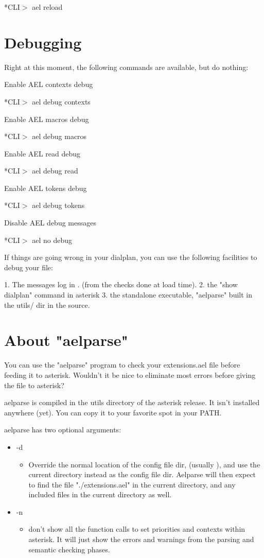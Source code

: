     *CLI$>$ ael reload

\section{Debugging}

Right at this moment, the following commands are available, but do
nothing:

Enable AEL contexts debug

   *CLI$>$ ael debug contexts

Enable AEL macros debug

   *CLI$>$ ael debug macros

Enable AEL read debug

   *CLI$>$ ael debug read

Enable AEL tokens debug

   *CLI$>$ ael debug tokens

Disable AEL debug messages

   *CLI$>$ ael no debug

If things are going wrong in your dialplan, you can use the following
facilities to debug your file:

1. The messages log in . (from the checks done at load time).
2. the "show dialplan" command in asterisk
3. the standalone executable, "aelparse" built in the utils/ dir in the source.


\section{About "aelparse"}

You can use the "aelparse" program to check your extensions.ael
file before feeding it to asterisk. Wouldn't it be nice to eliminate
most errors before giving the file to asterisk?

aelparse is compiled in the utils directory of the asterisk release.
It isn't installed anywhere (yet). You can copy it to your favorite
spot in your PATH.

aelparse has two optional arguments:

\begin{itemize}
  \item -d
  \begin{itemize}
    \item Override the normal location of the config file dir, (usually
       ), and use the current directory instead as the
       config file dir. Aelparse will then expect to find the file
       "./extensions.ael" in the current directory, and any included
       files in the current directory as well.
  \end{itemize}
  \item -n
  \begin{itemize}
    \item don't show all the function calls to set priorities and contexts
       within asterisk. It will just show the errors and warnings from
       the parsing and semantic checking phases.
  \end{itemize}
\end{itemize}


